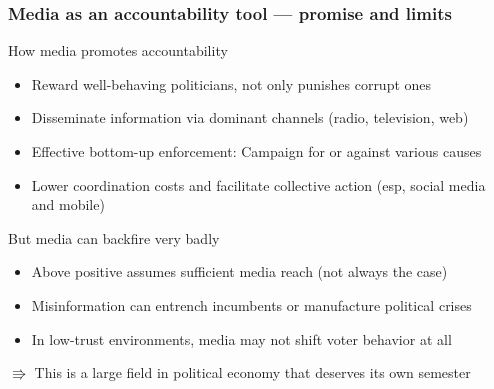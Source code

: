 \documentclass[aspectratio=169]{beamer}
\begin{document}
\begin{frame}
\frametitle{Media as an accountability tool — promise and limits}
How media promotes accountability
\begin{itemize}\setlength\itemsep{3pt}
  \item Reward well-behaving politicians, not only punishes corrupt ones
  \item Disseminate information via dominant channels (radio, television, web) 
  \item Effective bottom-up enforcement: Campaign for or against various causes
  \item Lower coordination costs and facilitate collective action (esp, social media and mobile)
  
\end{itemize}
 
\medskip
But media can backfire very badly
\begin{itemize}\setlength\itemsep{3pt}
  \item Above positive assumes sufficient media reach (not always the case)
  \item Misinformation can entrench incumbents or manufacture political crises
  \item In low-trust environments, media may not shift voter behavior at all
\end{itemize}\bigskip
$\Rrightarrow$ This is a large field in political economy that deserves its own semester
\end{frame}
\end{document}
